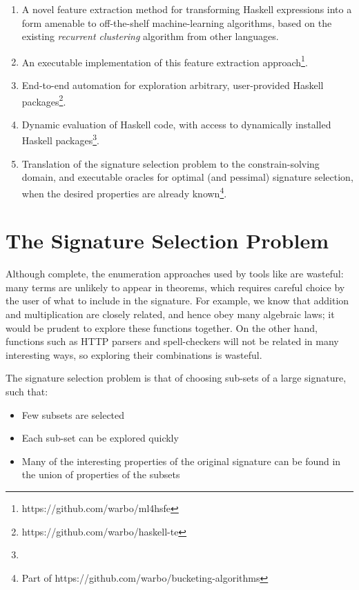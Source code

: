 \begin{enumerate}
\item A novel feature extraction method for transforming Haskell expressions
  into a form amenable to off-the-shelf machine-learning algorithms, based on
  the existing \emph{recurrent clustering} algorithm from other languages.
\item An executable implementation of this feature extraction
  approach\footnote{https://github.com/warbo/ml4hsfe}.
\item End-to-end automation for exploration arbitrary, user-provided Haskell
  packages\footnote{https://github.com/warbo/haskell-te}.
\item Dynamic evaluation of Haskell code, with access to dynamically installed
  Haskell packages\footnote{}.
\item Translation of the signature selection problem to the constrain-solving domain, and
  executable oracles for optimal (and pessimal) signature selection, when the desired
  properties are already known\footnote{Part of
    https://github.com/warbo/bucketing-algorithms}.
\end{enumerate}
\fi

\section{The Signature Selection Problem}
\label{sec:sigselect}

Although complete, the enumeration approaches used by tools like \quickspec{}
are wasteful: many terms are unlikely to appear in theorems, which requires
careful choice by the user of what to include in the signature. For example, we
know that addition and multiplication are closely related, and hence obey many
algebraic laws; it would be prudent to explore these functions together. On the
other hand, functions such as HTTP parsers and spell-checkers will not be
related in many interesting ways, so exploring their combinations is wasteful.

The signature selection problem is that of choosing sub-sets of a large
signature, such that:

\begin{itemize}
\item Few subsets are selected
\item Each sub-set can be explored quickly
\item Many of the interesting properties of the original signature can be
  found in the union of properties of the subsets
\end{itemize}

